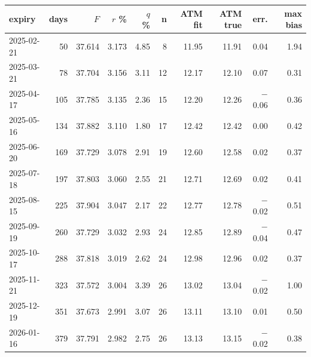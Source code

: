 \begin{center}\footnotesize
\begin{tabular}{|l|r|r|r|r|r|r|r|r|r|}
\hline
expiry & days & $F$ & $r$ \% & $q$ \% & n & ATM fit & ATM true & err. & max bias \\ \hline
2025-02-21 & 50 & 37.614 & 3.173 & 4.85 & 8 & 11.95 & 11.91 & 0.04 & 1.94 \\
2025-03-21 & 78 & 37.704 & 3.156 & 3.11 & 12 & 12.17 & 12.10 & 0.07 & 0.31 \\
2025-04-17 & 105 & 37.785 & 3.135 & 2.36 & 15 & 12.20 & 12.26 & $-$0.06 & 0.36 \\
2025-05-16 & 134 & 37.882 & 3.110 & 1.80 & 17 & 12.42 & 12.42 & 0.00 & 0.42 \\
2025-06-20 & 169 & 37.729 & 3.078 & 2.91 & 19 & 12.60 & 12.58 & 0.02 & 0.37 \\
2025-07-18 & 197 & 37.803 & 3.060 & 2.55 & 21 & 12.71 & 12.69 & 0.02 & 0.41 \\
2025-08-15 & 225 & 37.904 & 3.047 & 2.17 & 22 & 12.77 & 12.78 & $-$0.02 & 0.51 \\
2025-09-19 & 260 & 37.729 & 3.032 & 2.93 & 24 & 12.85 & 12.89 & $-$0.04 & 0.47 \\
2025-10-17 & 288 & 37.818 & 3.019 & 2.62 & 24 & 12.98 & 12.96 & 0.02 & 0.37 \\
2025-11-21 & 323 & 37.572 & 3.004 & 3.39 & 26 & 13.02 & 13.04 & $-$0.02 & 1.00 \\
2025-12-19 & 351 & 37.673 & 2.991 & 3.07 & 26 & 13.11 & 13.10 & 0.01 & 0.50 \\
2026-01-16 & 379 & 37.791 & 2.982 & 2.75 & 26 & 13.13 & 13.15 & $-$0.02 & 0.38 \\
\hline
\end{tabular}
\end{center}
